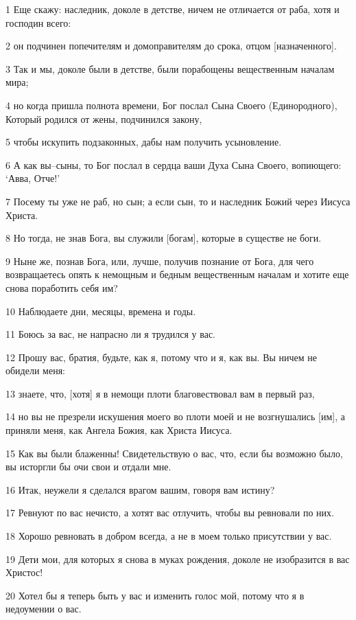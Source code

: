 \par 1 Еще скажу: наследник, доколе в детстве, ничем не отличается от раба, хотя и господин всего:
\par 2 он подчинен попечителям и домоправителям до срока, отцом [назначенного].
\par 3 Так и мы, доколе были в детстве, были порабощены вещественным началам мира;
\par 4 но когда пришла полнота времени, Бог послал Сына Своего (Единородного), Который родился от жены, подчинился закону,
\par 5 чтобы искупить подзаконных, дабы нам получить усыновление.
\par 6 А как вы--сыны, то Бог послал в сердца ваши Духа Сына Своего, вопиющего: `Авва, Отче!'
\par 7 Посему ты уже не раб, но сын; а если сын, то и наследник Божий через Иисуса Христа.
\par 8 Но тогда, не знав Бога, вы служили [богам], которые в существе не боги.
\par 9 Ныне же, познав Бога, или, лучше, получив познание от Бога, для чего возвращаетесь опять к немощным и бедным вещественным началам и хотите еще снова поработить себя им?
\par 10 Наблюдаете дни, месяцы, времена и годы.
\par 11 Боюсь за вас, не напрасно ли я трудился у вас.
\par 12 Прошу вас, братия, будьте, как я, потому что и я, как вы. Вы ничем не обидели меня:
\par 13 знаете, что, [хотя] я в немощи плоти благовествовал вам в первый раз,
\par 14 но вы не презрели искушения моего во плоти моей и не возгнушались [им], а приняли меня, как Ангела Божия, как Христа Иисуса.
\par 15 Как вы были блаженны! Свидетельствую о вас, что, если бы возможно было, вы исторгли бы очи свои и отдали мне.
\par 16 Итак, неужели я сделался врагом вашим, говоря вам истину?
\par 17 Ревнуют по вас нечисто, а хотят вас отлучить, чтобы вы ревновали по них.
\par 18 Хорошо ревновать в добром всегда, а не в моем только присутствии у вас.
\par 19 Дети мои, для которых я снова в муках рождения, доколе не изобразится в вас Христос!
\par 20 Хотел бы я теперь быть у вас и изменить голос мой, потому что я в недоумении о вас.
